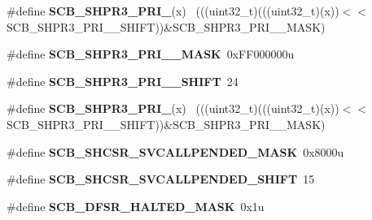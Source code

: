 \begin{DoxyCompactItemize}
\item 
\hypertarget{group___s_c_b___register___masks_gac0a05c0c7e3f7ddc6285c653c190a2d7}{}\#define {\bfseries S\+C\+B\+\_\+\+S\+H\+P\+R3\+\_\+\+P\+R\+I\+\_}(x)                                        ~(((uint32\+\_\+t)(((uint32\+\_\+t)(x))$<$$<$S\+C\+B\+\_\+\+S\+H\+P\+R3\+\_\+\+P\+R\+I\+\_\+\_\+\+S\+H\+I\+F\+T))\&S\+C\+B\+\_\+\+S\+H\+P\+R3\+\_\+\+P\+R\+I\+\_\+\_\+\+M\+A\+S\+K)\label{group___s_c_b___register___masks_gac0a05c0c7e3f7ddc6285c653c190a2d7}

\item 
\hypertarget{group___s_c_b___register___masks_gad0d8244bc4b757250164da7a7f5406ce}{}\#define {\bfseries S\+C\+B\+\_\+\+S\+H\+P\+R3\+\_\+\+P\+R\+I\+\_\+\_\+\+M\+A\+S\+K}~0x\+F\+F000000u\label{group___s_c_b___register___masks_gad0d8244bc4b757250164da7a7f5406ce}

\item 
\hypertarget{group___s_c_b___register___masks_ga28a5f46e257ba81d93a426436b8c795a}{}\#define {\bfseries S\+C\+B\+\_\+\+S\+H\+P\+R3\+\_\+\+P\+R\+I\+\_\+\_\+\+S\+H\+I\+F\+T}~24\label{group___s_c_b___register___masks_ga28a5f46e257ba81d93a426436b8c795a}

\item 
\hypertarget{group___s_c_b___register___masks_gaab039efcc046b9e78aa68a70957a4194}{}\#define {\bfseries S\+C\+B\+\_\+\+S\+H\+P\+R3\+\_\+\+P\+R\+I\+\_}(x)                                        ~(((uint32\+\_\+t)(((uint32\+\_\+t)(x))$<$$<$S\+C\+B\+\_\+\+S\+H\+P\+R3\+\_\+\+P\+R\+I\+\_\+\_\+\+S\+H\+I\+F\+T))\&S\+C\+B\+\_\+\+S\+H\+P\+R3\+\_\+\+P\+R\+I\+\_\+\_\+\+M\+A\+S\+K)\label{group___s_c_b___register___masks_gaab039efcc046b9e78aa68a70957a4194}

\item 
\hypertarget{group___s_c_b___register___masks_gaa3091912694f50ac51a925d4d7bcf854}{}\#define {\bfseries S\+C\+B\+\_\+\+S\+H\+C\+S\+R\+\_\+\+S\+V\+C\+A\+L\+L\+P\+E\+N\+D\+E\+D\+\_\+\+M\+A\+S\+K}~0x8000u\label{group___s_c_b___register___masks_gaa3091912694f50ac51a925d4d7bcf854}

\item 
\hypertarget{group___s_c_b___register___masks_gad441fbcc06889927347ce287c2520a97}{}\#define {\bfseries S\+C\+B\+\_\+\+S\+H\+C\+S\+R\+\_\+\+S\+V\+C\+A\+L\+L\+P\+E\+N\+D\+E\+D\+\_\+\+S\+H\+I\+F\+T}~15\label{group___s_c_b___register___masks_gad441fbcc06889927347ce287c2520a97}

\item 
\hypertarget{group___s_c_b___register___masks_ga68d1b868063cb70eb3bf3af375bea3cd}{}\#define {\bfseries S\+C\+B\+\_\+\+D\+F\+S\+R\+\_\+\+H\+A\+L\+T\+E\+D\+\_\+\+M\+A\+S\+K}~0x1u\label{group___s_c_b___register___masks_ga68d1b868063cb70eb3bf3af375bea3cd}


\end{DoxyCompactItemize}
